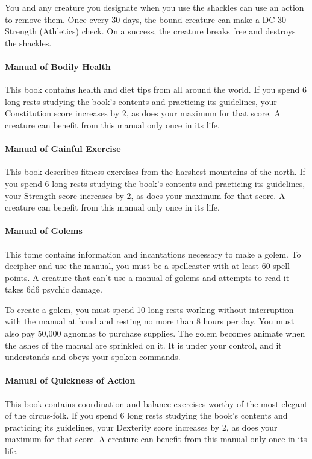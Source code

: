         You and any creature you designate when you use the shackles can use an action to remove them.
        Once every 30 days, the bound creature can make a DC 30 Strength (Athletics) check.
        On a success, the creature breaks free and destroys the shackles.
    \paragraph{Manual of Bodily Health}
        This book contains health and diet tips from all around the world.
        If you spend 6 long rests studying the book's contents and practicing its guidelines, your Constitution score increases by 2, as does your maximum for that score.
        A creature can benefit from this manual only once in its life.
    \paragraph{Manual of Gainful Exercise}
        This book describes fitness exercises from the harshest mountains of the north.
        If you spend 6 long rests studying the book's contents and practicing its guidelines, your Strength score increases by 2, as does your maximum for that score.
        A creature can benefit from this manual only once in its life.
    \paragraph{Manual of Golems}
        This tome contains information and incantations necessary to make a golem.
        To decipher and use the manual, you must be a spellcaster with at least 60 spell points.
        A creature that can't use a manual of golems and attempts to read it takes 6d6 psychic damage.

        To create a golem, you must spend 10 long rests working without interruption with the manual at hand and resting no more than 8 hours per day.
        You must also pay 50,000 agnomas to purchase supplies.
        The golem becomes animate when the ashes of the manual are sprinkled on it.
        It is under your control, and it understands and obeys your spoken commands.
    \paragraph{Manual of Quickness of Action}
        This book contains coordination and balance exercises worthy of the most elegant of the circus-folk.
        If you spend 6 long rests studying the book's contents and practicing its guidelines, your Dexterity score increases by 2, as does your maximum for that score.
        A creature can benefit from this manual only once in its life.
